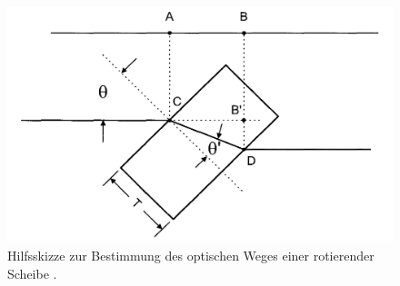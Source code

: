 \begin{figure}
	\centering
	\includegraphics[width=\linewidth-100pt,height=\textheight-100pt,keepaspectratio]{content/Bilder/drehscheibeskizze.png}
	\caption{Hilfsskizze zur Bestimmung des optischen Weges einer rotierender Scheibe \cite{V64}.}
	\label{fig:Drehscheibe}
\end{figure}

